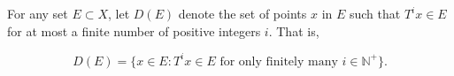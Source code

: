 For any set $E \subset X$, let $D(E)$ denote the set of points $x$ in $E$ such that $T^i x \in E$ for at most a finite number of positive integers $i$. That is,

$$D(E) = \{x \in E : T^i x \in E \text{ for only finitely many } i \in \mathbb{N}^+\}.$$
